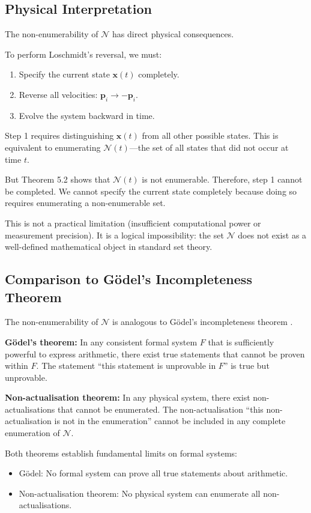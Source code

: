 \documentclass[twocolumn,10pt]{article}
\theoremstyle{definition}
\theoremstyle{remark}
\begin{document}
\subsection{Physical Interpretation}

The non-enumerability of $\mathcal{N}$ has direct physical consequences.

To perform Loschmidt's reversal, we must:
\begin{enumerate}
\item Specify the current state $\mathbf{x}(t)$ completely.
\item Reverse all velocities: $\mathbf{p}_i \to -\mathbf{p}_i$.
\item Evolve the system backward in time.
\end{enumerate}

Step 1 requires distinguishing $\mathbf{x}(t)$ from all other possible states. This is equivalent to enumerating $\mathcal{N}(t)$—the set of all states that did not occur at time $t$.

But Theorem 5.2 shows that $\mathcal{N}(t)$ is not enumerable. Therefore, step 1 cannot be completed. We cannot specify the current state completely because doing so requires enumerating a non-enumerable set.

This is not a practical limitation (insufficient computational power or measurement precision). It is a logical impossibility: the set $\mathcal{N}$ does not exist as a well-defined mathematical object in standard set theory.

\subsection{Comparison to Gödel's Incompleteness Theorem}

The non-enumerability of $\mathcal{N}$ is analogous to Gödel's incompleteness theorem \cite{godel1931}.

\textbf{Gödel's theorem:} In any consistent formal system $F$ that is sufficiently powerful to express arithmetic, there exist true statements that cannot be proven within $F$. The statement ``this statement is unprovable in $F$'' is true but unprovable.

\textbf{Non-actualisation theorem:} In any physical system, there exist non-actualisations that cannot be enumerated. The non-actualisation ``this non-actualisation is not in the enumeration'' cannot be included in any complete enumeration of $\mathcal{N}$.

Both theorems establish fundamental limits on formal systems:
\begin{itemize}
\item Gödel: No formal system can prove all true statements about arithmetic.
\item Non-actualisation theorem: No physical system can enumerate all non-actualisations.
\end{itemize}
\end{document}
